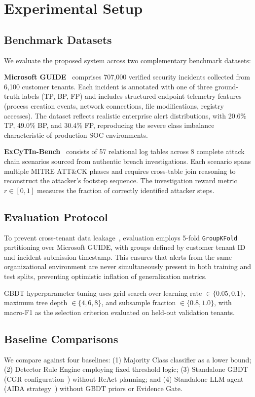 \section{Experimental Setup}
\label{sec:setup}

\subsection{Benchmark Datasets}

We evaluate the proposed system across two complementary benchmark datasets:

\textbf{Microsoft GUIDE}~\cite{freitas2024cgr} comprises 707,000 verified security
incidents collected from 6,100 customer tenants. Each incident is annotated with
one of three ground-truth labels (TP, BP, FP) and includes structured endpoint
telemetry features (process creation events, network connections, file modifications,
registry accesses). The dataset reflects realistic enterprise alert distributions,
with 20.6\% TP, 49.0\% BP, and 30.4\% FP, reproducing the severe class imbalance
characteristic of production SOC environments.

\textbf{ExCyTIn-Bench}~\cite{wu2026excytin} consists of 57 relational log tables
across 8 complete attack chain scenarios sourced from authentic breach investigations.
Each scenario spans multiple MITRE ATT\&CK phases and requires cross-table join
reasoning to reconstruct the attacker's footstep sequence. The investigation reward
metric $r \in [0, 1]$ measures the fraction of correctly identified attacker steps.

\subsection{Evaluation Protocol}

To prevent cross-tenant data leakage~\cite{arp2022dos}, evaluation employs
5-fold \texttt{GroupKFold} partitioning over Microsoft GUIDE, with groups defined
by customer tenant ID and incident submission timestamp. This ensures that alerts
from the same organizational environment are never simultaneously present in both
training and test splits, preventing optimistic inflation of generalization metrics.

GBDT hyperparameter tuning uses grid search over learning rate $\in \{0.05, 0.1\}$,
maximum tree depth $\in \{4, 6, 8\}$, and subsample fraction $\in \{0.8, 1.0\}$,
with macro-F1 as the selection criterion evaluated on held-out validation tenants.

\subsection{Baseline Comparisons}

We compare against four baselines: (1) Majority Class classifier as a lower bound;
(2) Detector Rule Engine employing fixed threshold logic; (3) Standalone GBDT
(CGR configuration~\cite{freitas2024cgr}) without ReAct planning; and (4) Standalone
LLM agent (AIDA strategy~\cite{tsegai2026aida}) without GBDT priors or Evidence Gate.
